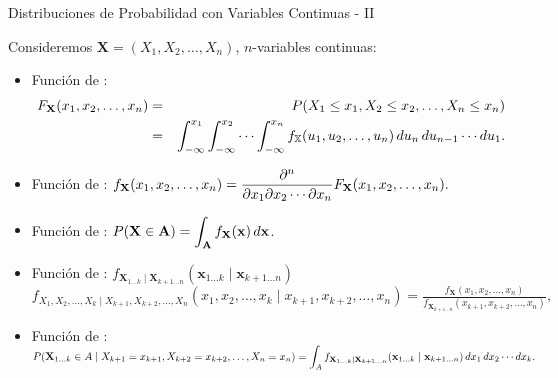 \documentclass[10pt, envcountsect, handout, aspectratio=1610, hyperref={hypertexnames=true}]{beamer}
\begin{document}
\begin{frame}{Distribuciones de Probabilidad  con Variables Continuas - II}

Consideremos $\mathbf{X}=(X_1, X_2, \ldots, X_n)$, $n$-variables continuas:

\begin{itemize}
\item Función de :
    \begin{eqnarray*}
    F_{\mathbf{X}}(x_1, x_2, \ldots, x_n) & = & 
    		P(X_1 \leq x_1, X_2 \leq x_2, \ldots, X_n \leq x_n) \\
    		&=& \displaystyle \int_{-\infty}^{x_1} \int_{-\infty}^{x_2} \cdots \int_{-\infty}^{x_n} f_{\mathbb{X}}(u_1, u_2, \ldots, u_n) \, du_n \, du_{n-1} \cdots du_1. 
    \end{eqnarray*}

\item Función de :
    $
    \displaystyle f_{\mathbf{X}}(x_1, x_2, \ldots, x_n) = 
    \frac{\partial^n}{\partial x_1 \partial x_2 \cdots \partial x_n} F_{\mathbf{X}}(x_1, x_2, \ldots, x_n).
    $


\item Función de :
    $\displaystyle P(\mathbf{X} \in \mathbf{A}) = \int_\mathbf{A} f_\mathbf{X}(\mathbf{x}) \, d\mathbf{x}$.

\item Función de : $f_{\mathbf{X}_{1\ldots k} \mid \mathbf{X}_{k+1\ldots n}}(\mathbf{x}_{1\ldots k} \mid \mathbf{x}_{k+1\ldots n})$\\
\hfil $
f_{X_1, X_2, \ldots, X_k \mid X_{k+1}, X_{k+2}, \ldots, X_n}(x_1, x_2, \ldots, x_k \mid x_{k+1}, x_{k+2}, \ldots, x_n) = 
\frac{f_{\mathbf{X}}(x_1, x_2, \ldots, x_n)}{f_{\mathbf{X}_{k+1\ldots n}}(x_{k+1}, x_{k+2}, \ldots, x_n)},
$

\item Función de :\\
\small 
$\displaystyle
P(\mathbf{X}_{1 \ldots k} \in A \mid X_{k+1} = x_{k+1}, X_{k+2} = x_{k+2}, \ldots, X_n = x_n) = 
\int_A f_{\mathbf{X}_{1\ldots k} \mid \mathbf{X}_{k+1\ldots n}}(\mathbf{x}_{1\ldots k} \mid \mathbf{x}_{k+1\ldots n}) \, dx_1 \, dx_2 \cdots dx_k.
$



\end{itemize}

\end{frame}  
   
\end{document}
